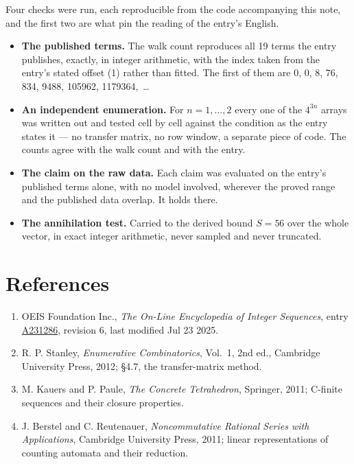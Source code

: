 \documentclass[11pt]{article}
\theoremstyle{definition}
\begin{document}
Four checks were run, each reproducible from the code accompanying this note, and the first two are what pin the reading of the entry's English.

\begin{itemize}

\item {\bfseries The published terms.} The walk count reproduces all 19 terms the entry publishes, exactly, in integer arithmetic, with the index taken from the entry's stated offset (1) rather than fitted. The first of them are 0, 0, 8, 76, 834, 9488, 105962, 1179364,~\dots

\item {\bfseries An independent enumeration.} For $n = 1,\dots,2$ every one of the $4^{3n}$ arrays was written out and tested cell by cell against the condition as the entry states it --- no transfer matrix, no row window, a separate piece of code. The counts agree with the walk count and with the entry.

\item {\bfseries The claim on the raw data.} Each claim was evaluated on the entry's published terms alone, with no model involved, wherever the proved range and the published data overlap. It holds there.

\item {\bfseries The annihilation test.} Carried to the derived bound $S = 56$ over the whole vector, in exact integer arithmetic, never sampled and never truncated.

\end{itemize}

\section{References}

\begin{enumerate}

\item OEIS Foundation Inc., \emph{The On-Line Encyclopedia of Integer Sequences}, entry \href{https://oeis.org/A231286}{A231286}, revision 6, last modified Jul 23 2025.

\item R. P. Stanley, \emph{Enumerative Combinatorics}, Vol.~1, 2nd ed., Cambridge University Press, 2012; \S4.7, the transfer-matrix method.

\item M. Kauers and P. Paule, \emph{The Concrete Tetrahedron}, Springer, 2011; C-finite sequences and their closure properties.

\item J. Berstel and C. Reutenauer, \emph{Noncommutative Rational Series with Applications}, Cambridge University Press, 2011; linear representations of counting automata and their reduction.

\end{enumerate}
\end{document}
